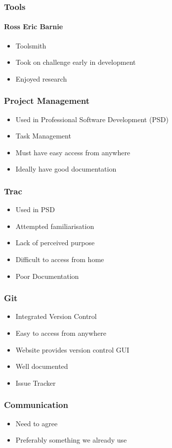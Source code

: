 
\begin{frame}
\frametitle{Tools}
\framesubtitle{Ross Eric Barnie}
\begin{itemize}
  \item{Toolsmith}
  \item{Took on challenge early in development}
  \item{Enjoyed research}
\end{itemize}
\end{frame}

\begin{frame}
\frametitle{Project Management}
\begin{itemize}
  \item{Used in Professional Software Development (PSD)}
  \item{Task Management}
  \item{Must have easy access from anywhere}
  \item{Ideally have good documentation}
\end{itemize}
\end{frame}

\begin{frame}
\frametitle{Trac}
\begin{itemize}
\item{Used in PSD}
\item{Attempted familiarisation}
\item{Lack of perceived purpose}
\item{Difficult to access from home}
\item{Poor Documentation}
\end{itemize}
\end{frame}

\begin{frame}
  \frametitle{Git}
  \begin{itemize}
  \item{Integrated Version Control}
  \item{Easy to access from anywhere}
  \item{Website provides version control GUI}
  \item{Well documented}
  \item{Issue Tracker}
  \end{itemize}
\end{frame}

\begin{frame}
  \frametitle{Communication}
  \begin{itemize}
  \item{Need to agree}
  \item{Preferably something we already use}
  \end{itemize}
\end{frame}

